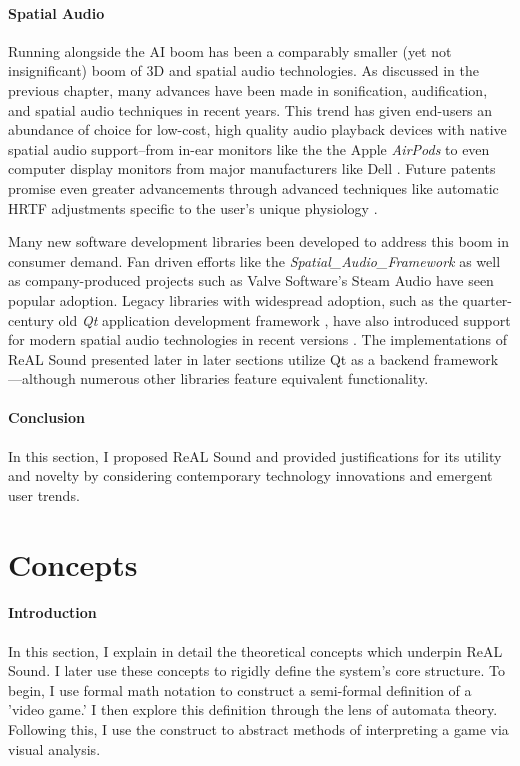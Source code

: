 \documentclass{report}
\newcommand{\rs}{ReAL Sound\xspace}
\begin{document}
\paragraph{Spatial Audio}
Running alongside the AI boom has been a comparably smaller (yet not insignificant) boom of 3D and spatial audio technologies. As discussed in the previous chapter, many advances have been made in sonification, audification, and spatial audio techniques in recent years. This trend has given end-users an abundance of choice for low-cost, high quality audio playback devices with native spatial audio support--from in-ear monitors like the the Apple \emph{AirPods} \cite{ApplePods} to even computer display monitors from major manufacturers like Dell \cite{Campbell_2025}. Future patents promise even greater advancements through advanced techniques like automatic HRTF adjustments specific to the user's unique physiology \cite{Antti2024}.


Many new software development libraries been developed to address this boom in consumer demand. Fan driven efforts like the \emph{Spatial\_Audio\_Framework} \cite{McCormack2024} as well as company-produced projects such as Valve Software's Steam Audio \cite{Valve} have seen popular adoption. Legacy libraries with widespread adoption, such as the quarter-century old \emph{Qt} application development framework \cite{QTProgramming}, have also introduced support for modern spatial audio technologies in recent versions \cite{QTSpatial}. The implementations of \rs presented later in later sections utilize Qt as a backend framework---although numerous other libraries feature equivalent functionality. 

\paragraph{Conclusion}
In this section, I proposed \rs and provided justifications for its utility and novelty by considering contemporary technology innovations and emergent user trends. 





\section{Concepts}
\paragraph{Introduction} 
In this section, I explain in detail the theoretical concepts which underpin \rs. I later use these concepts to rigidly define the system's core structure. To begin, I use formal math notation to construct a semi-formal definition of a 'video game.' I then explore this definition through the lens of automata theory. Following this, I use the construct to abstract methods of interpreting a game via visual analysis. 
\end{document}

